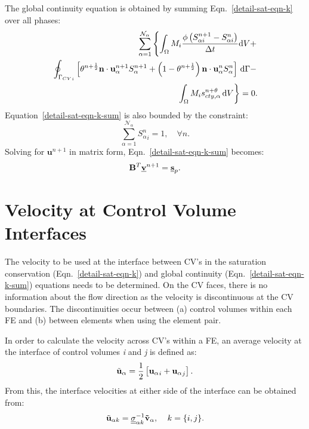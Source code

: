 The global continuity equation is obtained by summing Eqn.~\ref{detail-sat-eqn-k} over all phases:
\begin{eqnarray}
     \sum\limits_{\alpha=1}^{\mathcal{N}_{\alpha}} \left\lbrace \int_{\Omega} M_{i} \displaystyle\frac{\phi\left({S_{\alpha i}^{n+1}}-{S_{\alpha i}^{n}}\right) } {\Delta t} \mathrm{d} V + \right. \nonumber \\ 
     \left. \displaystyle\oint_{{\Gamma_{CV}}_{i}} \left[\theta^{n+\frac{1}{2}} {\mathbf n} \cdot {\mathbf u}_{\alpha}^{n+1} S_{\alpha}^{n+1} + \left(1-\theta^{n+\frac{1}{2}}\right) {\mathbf n} \cdot {\mathbf u}_{\alpha}^{n} S_{\alpha}^{n} \right] \,\mathrm{d}\Gamma - \right. \nonumber \\ 
     \left. \displaystyle\int_{\Omega} M_{i} s_{cty,\alpha}^{n+\theta}\, \mathrm{d} V \right\rbrace = 0. \label{detail-sat-eqn-k-sum}
\end{eqnarray}
Equation~\ref{detail-sat-eqn-k-sum} is also bounded by the constraint:
\begin{equation}
  \sum\limits_{\alpha=1}^{\mathcal{N}_{\alpha}} {S_{\alpha}^{n}}_{i} = 1, \quad \forall n.
\end{equation}
Solving for ${\mathbf u}^{n+1}$ in matrix form, Eqn.~\ref{detail-sat-eqn-k-sum} becomes:
\begin{equation}
  {\mathbf B}^T \underline{\bf v}^{n+1} = \underline{\bf s}_{p}.   \label{glob-cty-matrix}
\end{equation}


\section{Velocity at Control Volume Interfaces} \label{ChapterMultiFluidsModel:Section:opt-up} 
The velocity to be used at the interface between CV's in the saturation conservation (Eqn.~\ref{detail-sat-eqn-k}) and global continuity (Eqn.~\ref{detail-sat-eqn-k-sum}) equations needs to be determined. On the CV faces, there is no information about the flow direction as the velocity is discontinuous at the CV boundaries. The discontinuities occur between (a) control volumes within each FE and (b) between elements when using the  element pair.

In order to calculate the velocity across CV's within a FE, an average velocity at the interface of control volumes {\it i} and {\it j} is defined as:
\begin{equation}
  {\tilde{\bf u}}_\alpha = \frac{1}{2} \left[ {{\bf u}_\alpha}_i + {{\bf u}_\alpha}_j \right].
\end{equation} 
From this, the interface velocities at either side of the interface can be obtained from:
\begin{equation}
  {\tilde{\bf u}}_{\alpha k} = \underline{\underline{\sigma}}_{\alpha k}^{-1}{{\bf \tilde{v}}}_{\alpha}, \;\;\;\; k=\{i,j\}. 
  \label{two-vels}
\end{equation} 


